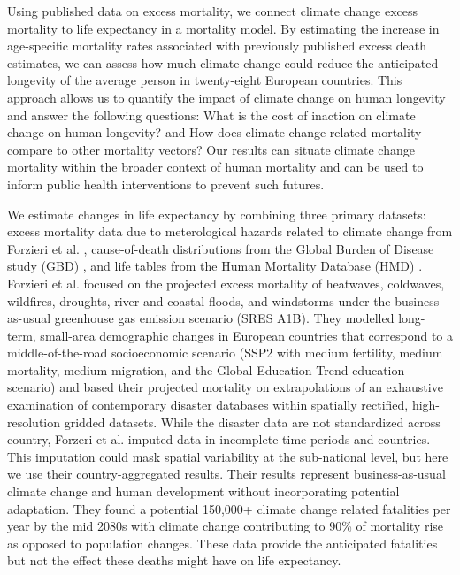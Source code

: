\documentclass[12pt,]{article}
\begin{document}
Using published data on excess mortality\citep{forzieri2017increasing},
we connect climate change excess mortality to life expectancy in a
mortality model. By estimating the increase in age-specific mortality
rates associated with previously published excess death estimates, we
can assess how much climate change could reduce the anticipated
longevity of the average person in twenty-eight European countries. This
approach allows us to quantify the impact of climate change on human
longevity and answer the following questions: What is the cost of
inaction on climate change on human longevity? and How does climate
change related mortality compare to other mortality vectors? Our results
can situate climate change mortality within the broader context of human
mortality and can be used to inform public health interventions to
prevent such futures.

We estimate changes in life expectancy by combining three primary
datasets: excess mortality data due to meterological hazards related to
climate change from Forzieri et al. \citep{forzieri2017increasing},
cause-of-death distributions from the Global Burden of Disease study
(GBD) \citep{GBD, wang2012age}, and life tables from the Human Mortality
Database (HMD) \citep{HMD}. Forzieri et al.
\citep{forzieri2017increasing} focused on the projected excess mortality
of heatwaves, coldwaves, wildfires, droughts, river and coastal floods,
and windstorms under the business-as-usual greenhouse gas emission
scenario (SRES A1B). They modelled long-term, small-area demographic
changes in European countries that correspond to a middle-of-the-road
socioeconomic scenario (SSP2 with medium fertility, medium mortality,
medium migration, and the Global Education Trend education scenario) and
based their projected mortality on extrapolations of an exhaustive
examination of contemporary disaster databases within spatially
rectified, high-resolution gridded datasets. While the disaster data are
not standardized across country, Forzeri et al. imputed data in
incomplete time periods and countries. This imputation could mask
spatial variability at the sub-national level, but here we use their
country-aggregated results. Their results represent business-as-usual
climate change and human development without incorporating potential
adaptation. They found a potential 150,000+ climate change related
fatalities per year by the mid 2080s with climate change contributing to
90\% of mortality rise as opposed to population changes. These data
provide the anticipated fatalities but not the effect these deaths might
have on life expectancy.
\end{document}
